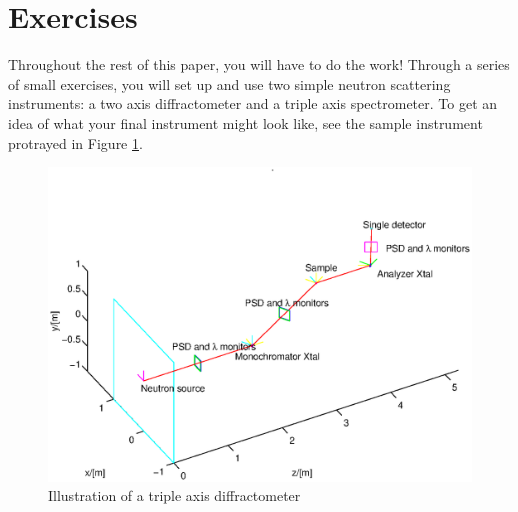 \section{Exercises}
Throughout the rest of this paper, you will have to do the work!
Through a series of small exercises, you will set up and use two simple
neutron scattering instruments: a two axis diffractometer and a triple axis spectrometer. To get an idea of what your final
instrument might look like, see the sample instrument protrayed in Figure \ref{instr.eps}.
\begin{figure}[htb!]
\begin{center}
\includegraphics[width=12cm]{pics/instr.eps}
\end{center}
\caption{Illustration of a triple axis diffractometer}
\label{instr.eps}
\end{figure}
